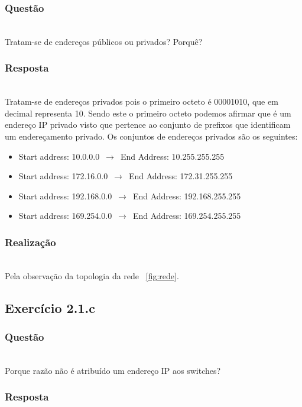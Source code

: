 \documentclass{llncs}
\begin{document}
\subsubsection{Questão}\rule[-10pt]{0pt}{10pt}\\

Tratam-se de endereços públicos ou privados? Porquê?

\subsubsection{Resposta}\rule[-10pt]{0pt}{10pt}\\

Tratam-se de endereços privados pois o primeiro octeto é 00001010, que em decimal representa 10. Sendo este o primeiro octeto podemos afirmar que é um endereço IP privado visto que pertence ao conjunto de prefixos que identificam um endereçamento privado. Os conjuntos de endereços privados são os seguintes: 

\begin{itemize}
	\item Start address: 10.0.0.0 $\,\to\,$ End Address: 10.255.255.255
	\item Start address: 172.16.0.0 $\,\to\,$ End Address: 172.31.255.255
	\item Start address: 192.168.0.0 $\,\to\,$ End Address: 192.168.255.255
	\item Start address: 169.254.0.0 $\,\to\,$ End Address: 169.254.255.255
\end{itemize}

\subsubsection{Realização}\rule[-10pt]{0pt}{10pt}\\

Pela observação da topologia da rede ~\ref{fig:rede}.

\subsection{Exercício 2.1.c}
\subsubsection{Questão}\rule[-10pt]{0pt}{10pt}\\

Porque razão não é atribuído um endereço IP aos switches?

\subsubsection{Resposta}\rule[-10pt]{0pt}{10pt}\\
\end{document}
